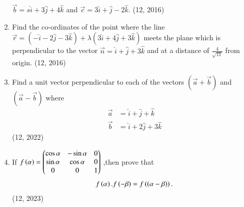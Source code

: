 \begin{enumerate}[label=\thesubsection.\arabic*,ref=\thesubsection.\theenumi]
      $\overrightarrow{b} = s\hat{i} +3\hat{j}+4\hat{k}$ and $\overrightarrow{c}=3\hat{i} +\hat{j}-2\hat{k}$. \hfill (12, 2016)
\item Find the co-ordinates of the point where the line $\overrightarrow{r}=(-\hat{i}-2\hat{j}-3\hat{k})+\lambda(3\hat{i} +4\hat{j}+3\hat{k})$ meets the plane which is perpendicular to the vector $\overrightarrow{n}=\hat{i}+\hat{j} +3\hat{k}$ and at a distance of
      $\frac{4}{\sqrt{11}}$ from origin. \hfill (12, 2016)
\item Find a unit vector perpendicular to each of the vectors $(\vec{a}+\vec{b})$ and $(\vec{a}-\vec{b})$ where 
\begin{align}
	\vec{a}&=\hat{i}+\hat{j}+\hat{k}\\
	\vec{b}&=\hat{i}+2\hat{j}+3\hat{k}
\end{align}
\hfill (12, 2022)
\item If $f\left(\alpha\right)=\begin{pmatrix}
    \cos\alpha & -\sin\alpha & 0\\
    \sin\alpha & \cos\alpha & 0\\
    0 & 0 & 1\end{pmatrix}$
 ,then prove that\begin{align}
      f\left(\alpha\right).f\left(-\beta\right) =f\left((\alpha - \beta)\right).
 \end{align}
\hfill (12, 2023)
\end{enumerate}
